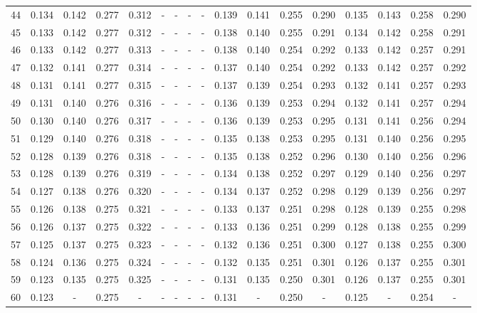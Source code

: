 \documentclass{report}
\begin{document}
\begin{appendices}
\begin{table}
\begin{tabular}{|c|cccc|cccc|cccc|cccc|}
44 & 0.134 & 0.142 & 0.277 & 0.312 &   -   &   -   &   -   &   -   & 0.139 & 0.141 & 0.255 & 0.290 & 0.135 & 0.143 & 0.258 & 0.290\\
45 & 0.133 & 0.142 & 0.277 & 0.312 &   -   &   -   &   -   &   -   & 0.138 & 0.140 & 0.255 & 0.291 & 0.134 & 0.142 & 0.258 & 0.291\\
46 & 0.133 & 0.142 & 0.277 & 0.313 &   -   &   -   &   -   &   -   & 0.138 & 0.140 & 0.254 & 0.292 & 0.133 & 0.142 & 0.257 & 0.291\\
47 & 0.132 & 0.141 & 0.277 & 0.314 &   -   &   -   &   -   &   -   & 0.137 & 0.140 & 0.254 & 0.292 & 0.133 & 0.142 & 0.257 & 0.292\\
48 & 0.131 & 0.141 & 0.277 & 0.315 &   -   &   -   &   -   &   -   & 0.137 & 0.139 & 0.254 & 0.293 & 0.132 & 0.141 & 0.257 & 0.293\\
49 & 0.131 & 0.140 & 0.276 & 0.316 &   -   &   -   &   -   &   -   & 0.136 & 0.139 & 0.253 & 0.294 & 0.132 & 0.141 & 0.257 & 0.294\\
50 & 0.130 & 0.140 & 0.276 & 0.317 &   -   &   -   &   -   &   -   & 0.136 & 0.139 & 0.253 & 0.295 & 0.131 & 0.141 & 0.256 & 0.294\\
51 & 0.129 & 0.140 & 0.276 & 0.318 &   -   &   -   &   -   &   -   & 0.135 & 0.138 & 0.253 & 0.295 & 0.131 & 0.140 & 0.256 & 0.295\\
52 & 0.128 & 0.139 & 0.276 & 0.318 &   -   &   -   &   -   &   -   & 0.135 & 0.138 & 0.252 & 0.296 & 0.130 & 0.140 & 0.256 & 0.296\\
53 & 0.128 & 0.139 & 0.276 & 0.319 &   -   &   -   &   -   &   -   & 0.134 & 0.138 & 0.252 & 0.297 & 0.129 & 0.140 & 0.256 & 0.297\\
54 & 0.127 & 0.138 & 0.276 & 0.320 &   -   &   -   &   -   &   -   & 0.134 & 0.137 & 0.252 & 0.298 & 0.129 & 0.139 & 0.256 & 0.297\\
55 & 0.126 & 0.138 & 0.275 & 0.321 &   -   &   -   &   -   &   -   & 0.133 & 0.137 & 0.251 & 0.298 & 0.128 & 0.139 & 0.255 & 0.298\\
56 & 0.126 & 0.137 & 0.275 & 0.322 &   -   &   -   &   -   &   -   & 0.133 & 0.136 & 0.251 & 0.299 & 0.128 & 0.138 & 0.255 & 0.299\\
57 & 0.125 & 0.137 & 0.275 & 0.323 &   -   &   -   &   -   &   -   & 0.132 & 0.136 & 0.251 & 0.300 & 0.127 & 0.138 & 0.255 & 0.300\\
58 & 0.124 & 0.136 & 0.275 & 0.324 &   -   &   -   &   -   &   -   & 0.132 & 0.135 & 0.251 & 0.301 & 0.126 & 0.137 & 0.255 & 0.301\\
59 & 0.123 & 0.135 & 0.275 & 0.325 &   -   &   -   &   -   &   -   & 0.131 & 0.135 & 0.250 & 0.301 & 0.126 & 0.137 & 0.255 & 0.301\\
60 & 0.123 &   -   & 0.275 &   -   &   -   &   -   &   -   &   -   & 0.131 &   -   & 0.250 &   -   & 0.125 &   -   & 0.254 &   -  \\
\hline
\end{tabular}
\end{table}


\end{appendices}
\end{document}
